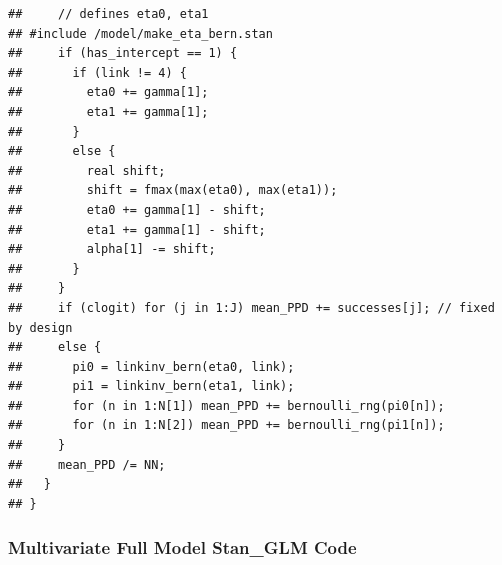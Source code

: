\documentclass[
]{article}
\newenvironment{Shaded}{\begin{snugshade}}{\end{snugshade}}
\newcommand{\KeywordTok}[1]{\textcolor[rgb]{0.13,0.29,0.53}{\textbf{#1}}}
\newcommand{\NormalTok}[1]{#1}
\newcommand{\OperatorTok}[1]{\textcolor[rgb]{0.81,0.36,0.00}{\textbf{#1}}}
\begin{document}
\begin{verbatim}
##     // defines eta0, eta1
## #include /model/make_eta_bern.stan
##     if (has_intercept == 1) {
##       if (link != 4) {
##         eta0 += gamma[1];
##         eta1 += gamma[1];
##       }      
##       else {
##         real shift;
##         shift = fmax(max(eta0), max(eta1));
##         eta0 += gamma[1] - shift;
##         eta1 += gamma[1] - shift;
##         alpha[1] -= shift;
##       }
##     }
##     if (clogit) for (j in 1:J) mean_PPD += successes[j]; // fixed by design
##     else {
##       pi0 = linkinv_bern(eta0, link);
##       pi1 = linkinv_bern(eta1, link);
##       for (n in 1:N[1]) mean_PPD += bernoulli_rng(pi0[n]);
##       for (n in 1:N[2]) mean_PPD += bernoulli_rng(pi1[n]);
##     }
##     mean_PPD /= NN;
##   }
## }
\end{verbatim}

\hypertarget{multivariate-full-model-stan_glm-code}{%
\subsubsection{Multivariate Full Model Stan\_GLM
Code}\label{multivariate-full-model-stan_glm-code}}

\begin{Shaded}
\end{Shaded}
\end{document}
